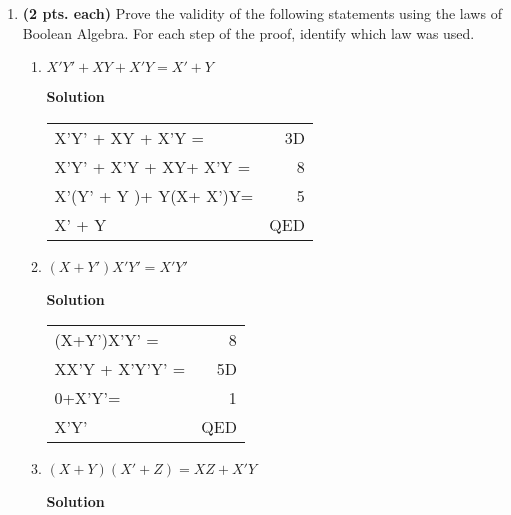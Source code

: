 \begin{enumerate}
    \item  \textbf{ (2 pts. each)} Prove the validity of the following
        statements using the laws of Boolean Algebra. For each step of
        the proof, identify which law was used.
        \begin{enumerate}
            \item $X'Y' + XY + X'Y = X' + Y$

                \begin{onlysolution}  \textbf{Solution} \itshape

                    \begin{tabular}{lr}
                        X'Y' + XY + X'Y =     & 3D\\
                        X'Y' + X'Y + XY+ X'Y =    & 8 \\
                        X'(Y' + Y )+ Y(X+ X')Y=    & 5 \\
                        X' + Y             & QED \\
                    \end{tabular}
                \end{onlysolution}

            \item $(X+Y')X'Y' = X'Y'$

                \begin{onlysolution}  \textbf{Solution} \itshape

                    \begin{tabular}{lr}
                        (X+Y')X'Y' =     & 8 \\
                        XX'Y + X'Y'Y' = & 5D \\
                        0+X'Y'=     & 1 \\
                        X'Y'         & QED \\
                    \end{tabular}
                \end{onlysolution}

            \item $(X+Y)(X'+Z) = XZ + X'Y$

                \begin{onlysolution}  \textbf{Solution} \itshape


\end{onlysolution}
\end{enumerate}
\end{enumerate}
